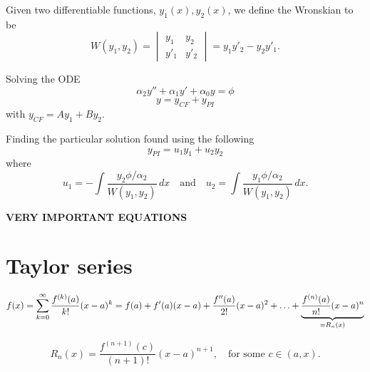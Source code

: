 \documentclass[10pt, a4paper]{article}
\begin{document}
\begin{definition}
    Given two differentiable functions,
    $y_1(x), y_2(x)$,
    we define the Wronskian to be
    \[
    W(y_1, y_2) = \begin{vmatrix}
        y_1 & y_2 \\ y'_1 & y'_2
    \end{vmatrix}
    = y_1y'_2 - y_2y'_1.
    \]
\end{definition}

Solving the ODE
\[
\alpha_2y'' + \alpha_1y' + \alpha_0y = \phi
\]
\[
y = y_{CF} + y_{PI}
\]
with $y_{CF} = Ay_1 + By_2$.

Finding the particular solution found using the following
\[
y_{PI} = u_1y_1 + u_2y_2
\]
where
\[
u_1 = -\int\frac{y_2 \phi / \alpha_2}{W(y_1, y_2)}\,dx\quad\text{and}\quad
u_2 = \int\frac{y_1 \phi / \alpha_2}{W(y_1, y_2)}\,dx.
\]

\textbf{VERY IMPORTANT EQUATIONS}
\begin{center}
\end{center}
\hfill

\newpage

\section{Taylor series}

\begin{definition}
    \[
    f(x) = \sum_{k = 0}^{\infty}\frac{f ^ {(k)}(a)}{k!}(x - a) ^ k = f(a) + f'(a)(x - a) + \frac{f''(a)}{2!}(x - a) ^ 2 + \dotsc + \underbrace{\frac{f ^ {(n)}(a)}{n!}(x - a) ^ n}_{= R_n(x)}
    \]
\end{definition}

\begin{definition}
    \[
    R_n(x) = \frac{f ^ {(n + 1)}(c)}{(n + 1)!}(x - a) ^ {n + 1},\quad\text{for some $c \in (a, x)$}.
    \]
\end{definition}
\end{document}
